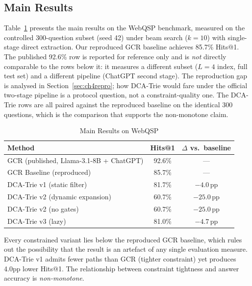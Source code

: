 \subsection{Main Results}

Table~\ref{tab:main_results} presents the main results on the WebQSP benchmark, measured on the controlled 300-question subset (seed 42) under beam search ($k{=}10$) with single-stage direct extraction. Our reproduced GCR baseline achieves 85.7\% Hits@1. The published 92.6\% row is reported for reference only and is \emph{not} directly comparable to the rows below it: it measures a different subset ($L{=}4$ index, full test set) and a different pipeline (ChatGPT second stage). The reproduction gap is analysed in Section~\ref{sec:ch4repro}; how DCA-Trie would fare under the official two-stage pipeline is a protocol question, not a constraint-quality one. The DCA-Trie rows are all paired against the reproduced baseline on the identical 300 questions, which is the comparison that supports the non-monotone claim.

\begin{table}[H]
  \centering
  \caption[Main Results on WebQSP (controlled 300-question subset)]{Main Results on WebQSP}
  \label{tab:main_results}
  \begin{tabularx}{\textwidth}{|X|c|c|}
    \hline
    \textbf{Method}                         & \textbf{Hits@1} & \textbf{$\Delta$ vs.\ baseline} \\
    \hline
    GCR (published, Llama-3.1-8B + ChatGPT) & 92.6\%          & ---                            \\
    \hline
    GCR Baseline (reproduced)               & 85.7\%          & ---                            \\
    \hline
    DCA-Trie v1 (static filter)             & 81.7\%          & $-4.0$\,pp                     \\
    \hline
    DCA-Trie v2 (dynamic expansion)         & 60.7\%          & $-25.0$\,pp                    \\
    \hline
    DCA-Trie v2 (no gates)                  & 60.7\%          & $-25.0$\,pp                    \\
    \hline
    DCA-Trie v3 (lazy)                      & 81.0\%          & $-4.7$\,pp                     \\
    \hline
  \end{tabularx}
\end{table}

Every constrained variant lies below the reproduced GCR baseline, which rules out the possibility that the result is an artefact of any single evaluation measure. DCA-Trie v1 admits fewer paths than GCR (tighter constraint) yet produces 4.0pp lower Hits@1. The relationship between constraint tightness and answer accuracy is \textit{non-monotone}.

